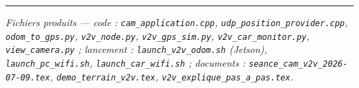 \documentclass[a4paper,11pt]{article}
\newcommand{\code}[1]{\texttt{#1}}
\begin{document}
\vspace{6pt}\hrule
{\footnotesize\itshape Fichiers produits --- code : \code{cam\_application.cpp},
\code{udp\_position\_provider.cpp}, \code{odom\_to\_gps.py}, \code{v2v\_node.py},
\code{v2v\_gps\_sim.py}, \code{v2v\_car\_monitor.py}, \code{view\_camera.py} ;
lancement : \code{launch\_v2v\_odom.sh} (Jetson), \code{launch\_pc\_wifi.sh},
\code{launch\_car\_wifi.sh} ; documents : \code{seance\_cam\_v2v\_2026-07-09.tex},
\code{demo\_terrain\_v2v.tex}, \code{v2v\_explique\_pas\_a\_pas.tex}.}
\end{document}
